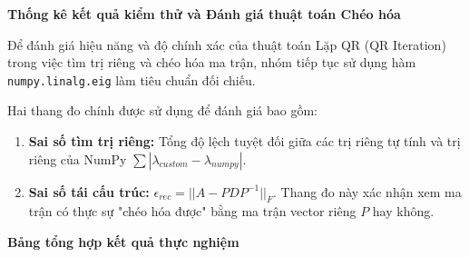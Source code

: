 \textbf{Thống kê kết quả kiểm thử và Đánh giá thuật toán Chéo hóa}

Để đánh giá hiệu năng và độ chính xác của thuật toán Lặp QR (QR Iteration) trong việc tìm trị riêng và chéo hóa ma trận, nhóm tiếp tục sử dụng hàm \texttt{numpy.linalg.eig} làm tiêu chuẩn đối chiếu. 

Hai thang đo chính được sử dụng để đánh giá bao gồm:
\begin{enumerate}
    \item \textbf{Sai số tìm trị riêng:} Tổng độ lệch tuyệt đối giữa các trị riêng tự tính và trị riêng của NumPy $\sum |\lambda_{custom} - \lambda_{numpy}|$.
    \item \textbf{Sai số tái cấu trúc:} $\epsilon_{rec} = ||A - P D P^{-1}||_F$. Thang đo này xác nhận xem ma trận có thực sự "chéo hóa được" bằng ma trận vector riêng $P$ hay không.
\end{enumerate}

\textbf{Bảng tổng hợp kết quả thực nghiệm}

